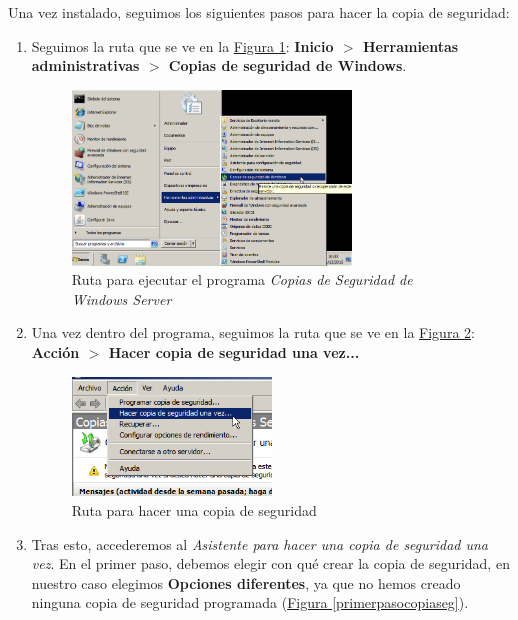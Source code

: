 \documentclass[10pt,a4paper,spanish]{article}
\numberwithin{equation}{section} %
\numberwithin{figure}{section} %
\numberwithin{table}{section} %
\begin{document}
Una vez instalado, seguimos los siguientes pasos para hacer la copia de seguridad:
\begin{enumerate}[1.]
    \item Seguimos la ruta que se ve en la \hyperref[copiaseg]{Figura \ref*{copiaseg}}: \textbf{Inicio $>$ Herramientas administrativas $>$ Copias de seguridad de Windows}.

    \begin{figure}[!h]
        \centering
        \includegraphics[width=0.7\textwidth]{2}
        \caption{Ruta para ejecutar el programa \textit{Copias de Seguridad de Windows Server}}
        \label{copiaseg}
    \end{figure}

    \item Una vez dentro del programa, seguimos la ruta que se ve en la \hyperref[unavez]{Figura \ref*{unavez}}: \textbf{Acción $>$ Hacer copia de seguridad una vez...}
    \begin{figure}[!h]
        \centering
        \includegraphics[width=0.5\textwidth]{3}
        \caption{Ruta para hacer una copia de seguridad}
        \label{unavez}
    \end{figure}

    \item Tras esto, accederemos al \textit{Asistente para hacer una copia de seguridad una vez}. En el primer paso, debemos elegir con qué crear la copia de seguridad, en nuestro caso elegimos \textbf{Opciones diferentes}, ya que no hemos creado ninguna copia de seguridad programada (\hyperref[primerpasocopiaseg]{Figura \ref*{primerpasocopiaseg}}).


\end{enumerate}
\end{document}
